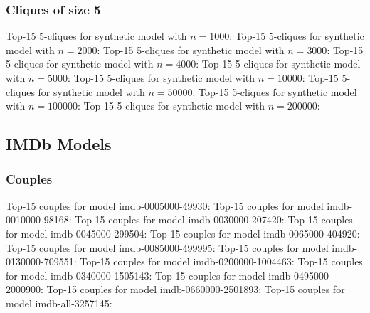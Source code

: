 \documentclass[a4paper,11pt]{article}
\newcommand{\p}[1]{\textsf{\small #1}}
\newcommand{\qr}[3]{\noindent{}Top-15 #2 for #3:{\scriptsize}}
\begin{document}
\newpage
\subsubsection{Cliques of size 5}

\qr{synth-1000.query.5cliques}{5-cliques}{synthetic model with \(n=1000\)}
\qr{synth-2000.query.5cliques}{5-cliques}{synthetic model with \(n=2000\)}
\qr{synth-3000.query.5cliques}{5-cliques}{synthetic model with \(n=3000\)}
\qr{synth-4000.query.5cliques}{5-cliques}{synthetic model with \(n=4000\)}
\qr{synth-5000.query.5cliques}{5-cliques}{synthetic model with \(n=5000\)}
\qr{synth-10000.query.5cliques}{5-cliques}{synthetic model with \(n=10000\)}
\qr{synth-50000.query.5cliques}{5-cliques}{synthetic model with \(n=50000\)}
\qr{synth-100000.query.5cliques}{5-cliques}{synthetic model with \(n=100000\)}
\qr{synth-200000.query.5cliques}{5-cliques}{synthetic model with \(n=200000\)}

\newpage
\subsection{IMDb Models}
\label{sec:top-15:imdb-models}

\subsubsection{Couples}

\qr{imdb-0005000-49930.movies.bin.query.couples}{couples}{model \p{imdb-0005000-49930}}
\qr{imdb-0010000-98168.movies.bin.query.couples}{couples}{model \p{imdb-0010000-98168}}
\qr{imdb-0030000-207420.movies.bin.query.couples}{couples}{model \p{imdb-0030000-207420}}
\qr{imdb-0045000-299504.movies.bin.query.couples}{couples}{model \p{imdb-0045000-299504}}
\qr{imdb-0065000-404920.movies.bin.query.couples}{couples}{model \p{imdb-0065000-404920}}
\qr{imdb-0085000-499995.movies.bin.query.couples}{couples}{model \p{imdb-0085000-499995}}
\qr{imdb-0130000-709551.movies.bin.query.couples}{couples}{model \p{imdb-0130000-709551}}
\qr{imdb-0200000-1004463.movies.bin.query.couples}{couples}{model \p{imdb-0200000-1004463}}
\qr{imdb-0340000-1505143.movies.bin.query.couples}{couples}{model \p{imdb-0340000-1505143}}
\qr{imdb-0495000-2000900.movies.bin.query.couples}{couples}{model \p{imdb-0495000-2000900}}
\qr{imdb-0660000-2501893.movies.bin.query.couples}{couples}{model \p{imdb-0660000-2501893}}
\qr{imdb-all-3257145.movies.bin.query.couples}{couples}{model \p{imdb-all-3257145}}
\end{document}
